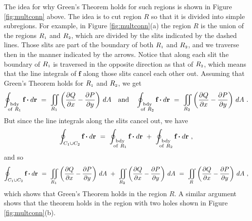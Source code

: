 The idea for why Green's Theorem holds for such regions is shown in Figure \ref{fig:multconn}
above. 
The idea is to cut region $R$ so that it is divided
into simple subregions. 
For example, in Figure \ref{fig:multconn}(a) the region $R$
is the union of the regions $R_{\scriptscriptstyle 1}$ and $R_{\scriptscriptstyle 2}$, which are divided by the slits indicated by the dashed
lines. 
Those slits are part of the boundary of both $R_{\scriptscriptstyle 1}$ and $R_{\scriptscriptstyle 2}$, and we traverse then in the manner
indicated by the arrows. 
Notice that along each slit
the boundary of $R_{\scriptscriptstyle 1}$ is traversed in the opposite direction as that of $R_{\scriptscriptstyle 2}$, which means that the
line integrals of $\mathbf{f}$ along those slits cancel each other out.
Assuming that Green's Theorem holds for  $R_{\scriptscriptstyle 1}$ and $R_{\scriptscriptstyle 2}$, we get
\begin{displaymath}
 \oint_{\substack{\text{bdy}\\\text{of}~R_{\scriptscriptstyle 1}}} \textbf{f} \bm{\cdot} d\textbf{r} ~=~ \iint\limits_{R_{\scriptscriptstyle 1}}
  \left( \frac{\partial Q}{\partial x} - \frac{\partial P}{\partial y} \right)\,dA \quad\text{and}\quad
 \oint_{\substack{\text{bdy}\\\text{of}~R_{\scriptscriptstyle 2}}} \textbf{f} \bm{\cdot} d\textbf{r} ~=~ \iint\limits_{R_{\scriptscriptstyle 2}}
  \left( \frac{\partial Q}{\partial x} - \frac{\partial P}{\partial y} \right)\,dA ~.
\end{displaymath}
But since the line integrals along the slits cancel out, we have
\begin{displaymath}
 \oint_{C_{\scriptscriptstyle 1} \cup C_{\scriptscriptstyle 2}} \textbf{f} \bm{\cdot} d\textbf{r} ~=~
 \oint_{\substack{\text{bdy}\\\text{of}~R_{\scriptscriptstyle 1}}} \textbf{f} \bm{\cdot} d\textbf{r} ~+~
 \oint_{\substack{\text{bdy}\\\text{of}~R_{\scriptscriptstyle 2}}} \textbf{f} \bm{\cdot} d\textbf{r} ~,
\end{displaymath}
and so
\begin{displaymath}
 \oint_{C_{\scriptscriptstyle 1} \cup C_{\scriptscriptstyle 2}} \textbf{f} \bm{\cdot} d\textbf{r} ~=~ \iint\limits_{R_{\scriptscriptstyle 1}}
  \left( \frac{\partial Q}{\partial x} - \frac{\partial P}{\partial y} \right)\,dA ~+~ \iint\limits_{R_{\scriptscriptstyle 2}}
  \left( \frac{\partial Q}{\partial x} - \frac{\partial P}{\partial y} \right)\,dA ~=~ \iint\limits_{R}
  \left( \frac{\partial Q}{\partial x} - \frac{\partial P}{\partial y} \right)\,dA ~,
\end{displaymath}
which shows that Green's Theorem holds in the region $R$. A similar argument shows that the theorem holds in the
region with two holes shown in Figure \ref{fig:multconn}(b).


